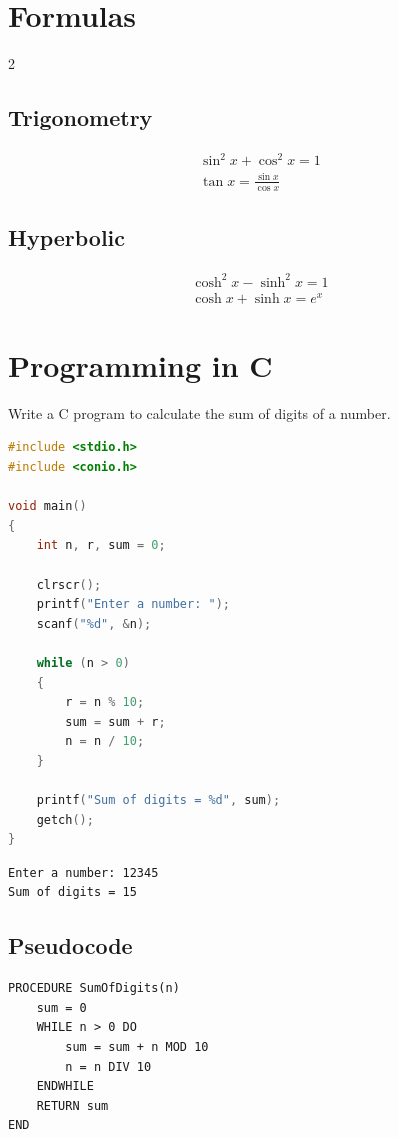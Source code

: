 \section*{Formulas}
\begin{multicols}{2}
\subsection*{Trigonometry}
\begin{gather*}
  \sin^{2}x+\cos^{2}x=1\\
  \tan x=\frac{\sin x}{\cos x}
\end{gather*}
\subsection*{Hyperbolic}
\begin{gather*}
  \cosh^{2}x-\sinh^{2}x=1\\
  \cosh x+\sinh x=e^{x}
\end{gather*}
\end{multicols}

\clearpage
\section*{Programming in C}
\noindent{} Write a C program to calculate the sum of digits of a number.

\noindent{}
\begin{lstlisting}[language=C]
#include <stdio.h>
#include <conio.h>

void main()
{
    int n, r, sum = 0;

    clrscr();
    printf("Enter a number: ");
    scanf("%d", &n);

    while (n > 0)
    {
        r = n % 10;
        sum = sum + r;
        n = n / 10;
    }

    printf("Sum of digits = %d", sum);
    getch();
}
\end{lstlisting}
\noindent{}
\begin{lstlisting}[style=srcoutput]
Enter a number: 12345
Sum of digits = 15
\end{lstlisting}

\subsection*{Pseudocode}
\begin{lstlisting}[style=pseudocode]
PROCEDURE SumOfDigits(n)
    sum = 0
    WHILE n > 0 DO
        sum = sum + n MOD 10
        n = n DIV 10
    ENDWHILE
    RETURN sum
END
\end{lstlisting}


